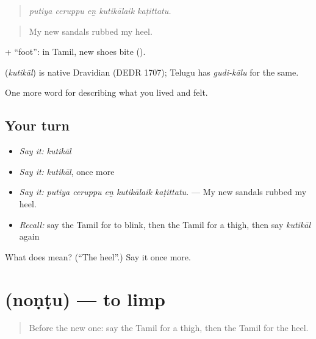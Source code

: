 \begin{quote}
\emph{putiya ceruppu eṉ kutikālaik kaṭittatu.}
\end{quote}

\begin{quote}
My new sandals rubbed my heel.
\end{quote}

 +  \textquotedblleft{}foot\textquotedblright{}: in Tamil, new shoes bite ().

\begin{cousinweb}
\textbf{} (\emph{kutikāl}) is native Dravidian (DEDR 1707); Telugu has \emph{gudi-kālu} for the same.
\end{cousinweb}

\begin{grammarlens}[title={What you've built}]
One more word for describing what you lived and felt.
\end{grammarlens}

\subsection*{Your turn}
\begin{itemize}
\raggedright
  \item \emph{Say it:} \emph{kutikāl}
  \item \emph{Say it:} \emph{kutikāl}, once more
  \item \emph{Say it:} \emph{putiya ceruppu eṉ kutikālaik kaṭittatu.} — My new sandals rubbed my heel.
  \item \emph{Recall:} say the Tamil for to blink, then the Tamil for a thigh, then say \emph{kutikāl} again
\end{itemize}

\begin{tcolorbox}[breakable,colback=teal!4,colframe=teal!35!black,title={Before you move on}]
What does  mean? (\textquotedblleft{}The heel\textquotedblright{}.) Say it once more.
\end{tcolorbox}
\section[\texorpdfstring{\ta{நொண்டு} (noṇṭu)}{நொண்டு (noṇṭu)}]{ (noṇṭu) — to limp}

\label{lesson:TA-C481-nontu}



\begin{quote}
Before the new one: say the Tamil for a thigh, then the Tamil for the heel.
\end{quote}

